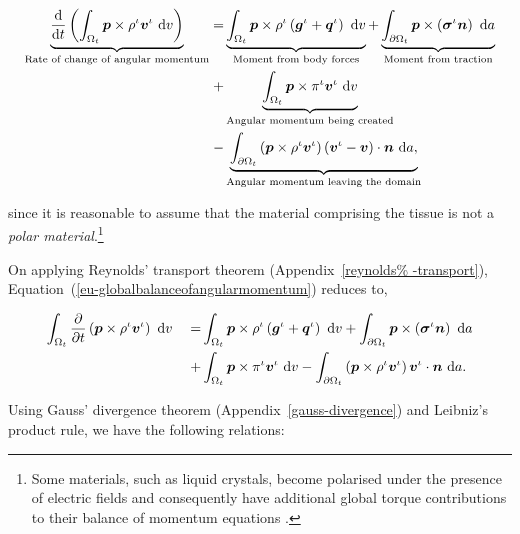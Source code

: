 \begin{equation}
\begin{split}
\underbrace{\frac{\mathrm{d}}{\mathrm{d}t}\left(\int_{\Omega_{t}} \mbox{\boldmath$ p$}
  \times \rho^{\iota} \mbox{\boldmath$ v$}^{\iota}\ \mathrm{d}v\right)}_{\text{Rate of
    change of angular momentum}} = & \underbrace{\int_{\Omega_{t}} \mbox{\boldmath$ p$}
  \times \rho^{\iota} \left(\mbox{\boldmath$ g$}^{\iota} +
  \mbox{\boldmath$ q$}^{\iota}\right)\ \mathrm{d}v}_{\text{Moment from body forces}} +
\underbrace{\int_{\partial \Omega_{t}} \mbox{\boldmath$ p$} \times
  \left(\mbox{\boldmath$\sigma$}^{\iota}\mbox{\boldmath$ n$}\right)\ \mathrm{d}a}_{\text{Moment from
    traction}}\\ + & \underbrace{\int_{\Omega_{t}} \mbox{\boldmath$ p$} \times
  \pi^{\iota}\mbox{\boldmath$ v$}^{\iota}\ \mathrm{d}v}_{\text{Angular momentum being
    created}} \\ - & \underbrace{\int_{\partial \Omega_{t}} \left(\mbox{\boldmath$ p$}
  \times \rho^{\iota} \mbox{\boldmath$ v$}^{\iota}\right) \left(\mbox{\boldmath$ v$}^{\iota} -
  \mbox{\boldmath$ v$}\right) \cdot \mbox{\boldmath$ n$}\ \mathrm{d}a,}_{\text{Angular momentum leaving
    the domain}}
\end{split}
\label{eu-globalbalanceofangularmomentum}
\end{equation}

\noindent since it is reasonable to assume that the material
comprising the tissue is not a {\em polar material}.\footnote{Some
  materials, such as liquid crystals, become polarised under the
  presence of electric fields and consequently have additional global
  torque contributions to their balance of momentum equations
  \citep{TruesdellNoll:65}.}

On applying Reynolds' transport theorem (Appendix~\ref{reynolds%
  -transport}), Equation~(\ref{eu-globalbalanceofangularmomentum})
reduces to,

\begin{equation*}
\begin{split}
\int_{\Omega_{t}} \frac{\partial}{\partial t}\left( \mbox{\boldmath$ p$} \times \rho^{\iota}
  \mbox{\boldmath$ v$}^{\iota}\right)\ \mathrm{d}v \quad =
& \int_{\Omega_{t}} \mbox{\boldmath$ p$} \times \rho^{\iota} \left(\mbox{\boldmath$ g$}^{\iota} +
  \mbox{\boldmath$ q$}^{\iota}\right)\ \mathrm{d}v
+ \int_{\partial \Omega_{t}}
  \mbox{\boldmath$ p$} \times \left(\mbox{\boldmath$\sigma$}^{\iota}\mbox{\boldmath$ n$}\right)\ \mathrm{d}a\\
+ & \int_{\Omega_{t}} \mbox{\boldmath$ p$} \times 
  \pi^{\iota}\mbox{\boldmath$ v$}^{\iota}\ \mathrm{d}v - \int_{\partial \Omega_{t}} \left(\mbox{\boldmath$ p$}
  \times \rho^{\iota} 
  \mbox{\boldmath$ v$}^{\iota}\right) \mbox{\boldmath$ v$}^{\iota} \cdot \mbox{\boldmath$ n$}\ \mathrm{d}a.
\end{split}
\end{equation*}

Using Gauss' divergence theorem (Appendix~\ref{gauss-divergence}) and
Leibniz's product rule, we have the following relations:

